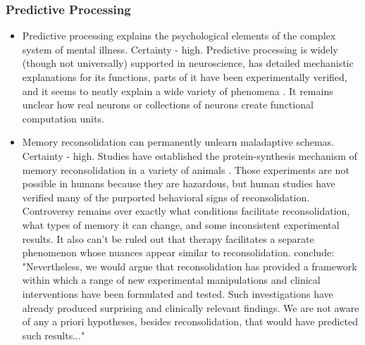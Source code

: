 \documentclass[12pt,letterpaper]{book}
\begin{document}
\subsubsection*{Predictive Processing}
\begin{itemize}
	\item Predictive processing explains the psychological elements of the complex system of mental illness. Certainty - high. Predictive processing is widely (though not universally) supported in neuroscience, has detailed mechanistic explanations for its functions, parts of it have been experimentally verified, and it seems to neatly explain a wide variety of phenomena \cite{aizenbud2025neuralmechanismspredictiveprocessing,clark2015surfing,Clark_Watson_Friston_2018,eckerUnlocking,laneReconsolidation}. It remains unclear how real neurons or collections of neurons create functional computation units.
	\item Memory reconsolidation can permanently unlearn maladaptive schemas. Certainty - high. Studies have established the protein-synthesis mechanism of memory reconsolidation in a variety of animals \cite{eckerUnlocking,laneReconsolidation,elsey2018human}. Those experiments are not possible in humans because they are hazardous, but human studies have verified many of the purported behavioral signs of reconsolidation. Controversy remains over exactly what conditions facilitate reconsolidation, what types of memory it can change, and some inconsistent experimental results. It also can't be ruled out that therapy facilitates a separate phenomenon whose nuances appear similar to reconsolidation. \textcite{elsey2018human} conclude: "Nevertheless, we would argue that reconsolidation has provided a framework within which a range of new experimental manipulations and clinical interventions have been formulated and tested. Such investigations have already produced surprising and clinically relevant findings. We are not aware of any a priori hypotheses, besides reconsolidation, that would have predicted such results..."

\end{itemize}
\end{document}
